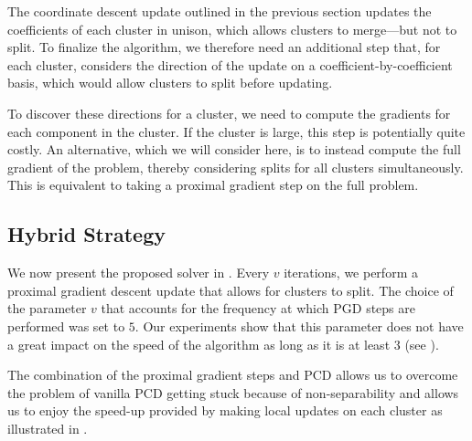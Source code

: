 The coordinate descent update outlined in the previous section updates the coefficients of each cluster in unison, which allows clusters to merge---but not to split.
To finalize the algorithm, we therefore need an additional step that, for each cluster, considers the direction of the update on a coefficient-by-coefficient basis, which would allow clusters to split before updating.

To discover these directions for a cluster, we need to compute the gradients for each component in the cluster.
If the cluster is large, this step is potentially quite costly.
An alternative, which we will consider here, is to instead compute the full gradient of the problem, thereby considering splits for all clusters simultaneously.
This is equivalent to taking a proximal gradient step on the full problem.

\subsection{Hybrid Strategy}
\label{sec:hybrid-strategy}

We now present the proposed solver in .
Every $v$ iterations, we perform a proximal gradient descent update that allows for clusters to split.
The choice of the parameter $v$ that accounts for the frequency at which PGD steps are performed was set to $5$.
Our experiments show that this parameter does not have a great impact on the speed of the algorithm as long as it is at least $3$ (see ).

The combination of the proximal gradient steps and PCD allows us to overcome the problem of vanilla PCD getting stuck because of non-separability and allows us to enjoy the speed-up provided by making local updates on each cluster as illustrated in .

